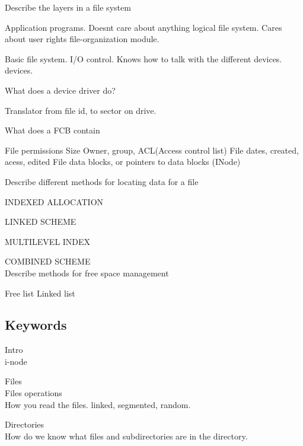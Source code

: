 \documentclass[a4paper,10pt,titlepage]{report}
\begin{document}
	

Describe the layers in a file system

	Application programs.
		Doesnt care about anything
	logical file system.
		Cares about user rights
	file-organization module.
		
	Basic file system.
	I/O control.
		Knows how to talk with the different devices.
	devices.


What does a device driver do?
	
	Translator from file id, to sector on drive.

What does a FCB contain
	
	File permissions
	Size
	Owner, group, ACL(Access control list)
	File dates, created, acess, edited
	File data blocks, or pointers to data blocks (INode)

Describe different methods for locating data for a file
	
	INDEXED ALLOCATION

	LINKED SCHEME
	
	MULTILEVEL INDEX
	
	COMBINED SCHEME\\
	

Describe methods for free space management

	Free list
		Linked list
		

	




\subsection{Keywords}
Intro\\
	i-node\\
	
	
\vspace{5mm}
	
	
Files\\
\hspace{10mm}	Files operations\\
\hspace{10mm}	How you read the files. linked, segmented, random.\\
	
	
\vspace{5mm}
	
	
Directories\\
\hspace{10mm}	How do we know what files and subdirectories are in the directory.\\
	
\end{document}
